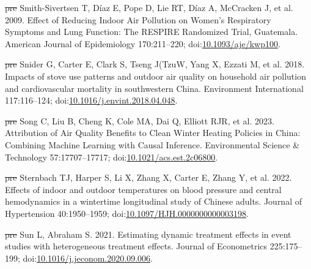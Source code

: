 \documentclass[
  letterpaper,
  DIV=11,
  numbers=noendperiod]{scrartcl}
\newlength{\cslhangindent}
\newenvironment{CSLReferences}[2] %
 {\begin{list}{}{%
  \setlength{\itemindent}{0pt} %
  \setlength{\leftmargin}{0pt} %
  \setlength{\parsep}{0pt} %
  \ifodd #1
   \setlength{\leftmargin}{\cslhangindent} %
   \setlength{\itemindent}{-1\cslhangindent} %
  \fi
  \setlength{\itemsep}{#2\baselineskip}}} %
 {\end{list}} %
\providecommand{\DIFdel}[1]{{\protect\color{red}\sout{#1}}}                      %
\providecommand{\DIFaddbegin}{} %
\providecommand{\DIFaddend}{} %
\providecommand{\DIFdelbegin}{} %
\providecommand{\DIFdelend}{} %
\newcommand{\DIFscaledelfig}{0.5}
\newlength{\DIFdelgraphicswidth} %
\newlength{\DIFdelgraphicsheight} %
\newcommand{\DIFaddincludegraphics}[2][]{{\color{blue}\fbox{\DIFOincludegraphics[#1]{#2}}}} %
\newcommand{\DIFdelincludegraphics}[2][]{%
\sbox{\DIFdelgraphicsbox}{\DIFOincludegraphics[#1]{#2}}%
\settoboxwidth{\DIFdelgraphicswidth}{\DIFdelgraphicsbox} %
\settoboxtotalheight{\DIFdelgraphicsheight}{\DIFdelgraphicsbox} %
\scalebox{\DIFscaledelfig}{%
\parbox[b]{\DIFdelgraphicswidth}{\usebox{\DIFdelgraphicsbox}\\[-\baselineskip] \rule{\DIFdelgraphicswidth}{0em}}\llap{\resizebox{\DIFdelgraphicswidth}{\DIFdelgraphicsheight}{%
\setlength{\unitlength}{\DIFdelgraphicswidth}%
\begin{picture}(1,1)%
\thicklines\linethickness{2pt} %
{\color[rgb]{1,0,0}\put(0,0){\framebox(1,1){}}}%
{\color[rgb]{1,0,0}\put(0,0){\line( 1,1){1}}}%
{\color[rgb]{1,0,0}\put(0,1){\line(1,-1){1}}}%
\end{picture}%
}\hspace*{3pt}}} %
} %
\DeclareRobustCommand{\DIFaddbegin}{\DIFOaddbegin \let\includegraphics\DIFaddincludegraphics} %
\DeclareRobustCommand{\DIFaddend}{\DIFOaddend \let\includegraphics\DIFOincludegraphics} %
\DeclareRobustCommand{\DIFdelbegin}{\DIFOdelbegin \let\includegraphics\DIFdelincludegraphics} %
\DeclareRobustCommand{\DIFdelend}{\DIFOaddend \let\includegraphics\DIFOincludegraphics} %
\begin{document}
\begin{CSLReferences}{1}{1}
\DIFdelbegin %
\DIFdel{pre}%
\DIFdelend \DIFaddbegin {}
\DIFaddend Smith-Sivertsen T, Díaz E, Pope D, Lie RT, Díaz A, McCracken J, et al.
2009. Effect of {Reducing Indoor Air Pollution} on {Women}'s
{Respiratory Symptoms} and {Lung Function}: {The RESPIRE Randomized
Trial}, {Guatemala}. American Journal of Epidemiology 170:211--220;
doi:\href{https://doi.org/10.1093/aje/kwp100}{10.1093/aje/kwp100}.

\DIFdelbegin %
\DIFdel{pre}%
\DIFdelend \DIFaddbegin {}
\DIFaddend Snider G, Carter E, Clark S, Tseng J(TzuW, Yang X, Ezzati M, et al.
2018. Impacts of stove use patterns and outdoor air quality on household
air pollution and cardiovascular mortality in southwestern {China}.
Environment International 117:116--124;
doi:\href{https://doi.org/10.1016/j.envint.2018.04.048}{10.1016/j.envint.2018.04.048}.

\DIFdelbegin %
\DIFdel{pre}%
\DIFdelend \DIFaddbegin {}
\DIFaddend Song C, Liu B, Cheng K, Cole MA, Dai Q, Elliott RJR, et al. 2023.
Attribution of {Air Quality Benefits} to {Clean Winter Heating Policies}
in {China}: {Combining Machine Learning} with {Causal Inference}.
Environmental Science \& Technology 57:17707--17717;
doi:\href{https://doi.org/10.1021/acs.est.2c06800}{10.1021/acs.est.2c06800}.

\DIFdelbegin %
\DIFdel{pre}%
\DIFdelend \DIFaddbegin {}
\DIFaddend Sternbach TJ, Harper S, Li X, Zhang X, Carter E, Zhang Y, et al. 2022.
Effects of indoor and outdoor temperatures on blood pressure and central
hemodynamics in a wintertime longitudinal study of {Chinese} adults.
Journal of Hypertension 40:1950--1959;
doi:\href{https://doi.org/10.1097/HJH.0000000000003198}{10.1097/HJH.0000000000003198}.

\DIFdelbegin %
\DIFdel{pre}%
\DIFdelend \DIFaddbegin {}
\DIFaddend Sun L, Abraham S. 2021. Estimating dynamic treatment effects in event
studies with heterogeneous treatment effects. Journal of Econometrics
225:175--199;
doi:\href{https://doi.org/10.1016/j.jeconom.2020.09.006}{10.1016/j.jeconom.2020.09.006}.


\end{CSLReferences}
\end{document}
